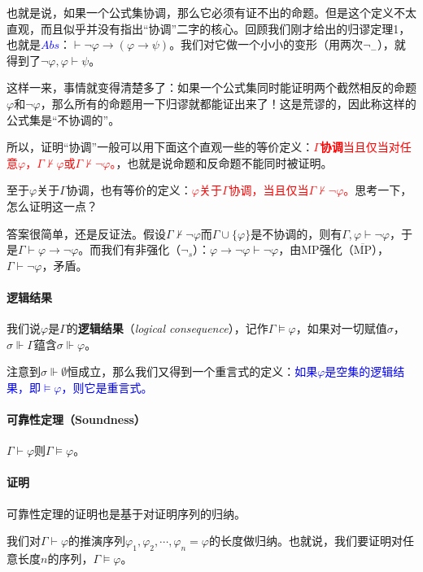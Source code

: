 \documentclass[b5paper,oneside]{ctexbook}
\newcommand{\Blue}[1]{\textcolor[named]{blue}{#1}}
\newcommand{\Red}[1]{\textcolor[named]{red}{#1}}
\begin{document}
也就是说，如果一个公式集协调，那么它必须有证不出的命题。但是这个定义不太直观，而且似乎并没有指出“协调”二字的核心。回顾我们刚才给出的归谬定理1，也就是\Blue{$Abs$}：$\vdash\neg\varphi\to(\varphi\to\psi)$。我们对它做一个小小的变形（用两次$\neg_-$），就得到了$\neg\varphi ,\varphi\vdash\psi$。

这样一来，事情就变得清楚多了：如果一个公式集同时能证明两个截然相反的命题$\varphi$和$\neg\varphi$，那么所有的命题用一下归谬就都能证出来了！这是荒谬的，因此称这样的公式集是“不协调的”。

所以，证明“协调”一般可以用下面这个直观一些的等价定义：\Red{$\Gamma$\textbf{协调}当且仅当对任意$\varphi$，$\Gamma\not\vdash\varphi$或$\Gamma\not\vdash\neg\varphi$。}，也就是说命题和反命题不能同时被证明。

至于$\varphi$关于$\Gamma$协调，也有等价的定义：\Red{$\varphi$关于$\Gamma$协调，当且仅当$\Gamma\not\vdash\neg\varphi$。}思考一下，怎么证明这一点？

答案很简单，还是反证法。假设$\Gamma\not\vdash\neg\varphi$而$\Gamma\cup\{\varphi\}$是不协调的，则有$\Gamma,\varphi\vdash\neg\varphi$，于是$\Gamma\vdash\varphi\to\neg\varphi$。而我们有非强化（$\neg_s$）：$\varphi\to\neg\varphi\vdash\neg\varphi$，由MP强化（$\overline{\mathrm{MP}}$），$\Gamma\vdash\neg\varphi$，矛盾。

\paragraph{逻辑结果}我们说$\varphi$是$\Gamma$的\textbf{逻辑结果}（\textit{logical consequence}），记作$\Gamma\models\varphi$，如果对一切赋值$\sigma$，$\sigma\Vdash\Gamma$蕴含$\sigma\Vdash\varphi$。\label{models}

注意到$\sigma\Vdash\emptyset$恒成立，那么我们又得到一个重言式的定义：\Blue{如果$\varphi$是空集的逻辑结果，即$\models \varphi$，则它是重言式。}
\paragraph{可靠性定理（Soundness）}$\Gamma\vdash\varphi$则$\Gamma\models\varphi$。
\paragraph{证明}可靠性定理的证明也是基于对证明序列的归纳。

我们对$\Gamma\vdash\varphi$的推演序列$\varphi_1 ,\varphi_2 ,\cdots ,\varphi_n=\varphi$的长度做归纳。也就说，我们要证明对任意长度$n$的序列，$\Gamma\models\varphi$。
\end{document}
